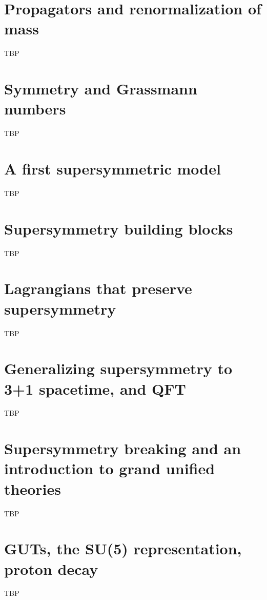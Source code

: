 \documentclass[]{article}
\begin{document}
\section{Propagators and renormalization of mass}

TBP

\section{Symmetry and Grassmann numbers}

TBP

\section{A first supersymmetric model}

TBP

\section{Supersymmetry building blocks}

TBP

\section{Lagrangians that preserve supersymmetry}

TBP

\section{Generalizing supersymmetry to 3+1 spacetime, and QFT}

TBP

\section{Supersymmetry breaking and an introduction to grand unified theories}

TBP

\section{GUTs, the SU(5) representation, proton decay}

TBP



\raggedright

\end{document}
